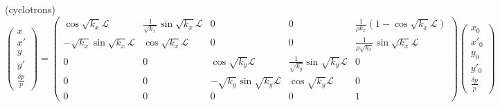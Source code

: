 \documentclass[12pt]{article}
\begin{document}
{ (cyclotrons)
{%
$$\left(
\begin{array}{ccccc} x \\ x' \\ y \\ y' \\ \frac{\textstyle{\delta p}}{\textstyle{p}} 
\end{array} 
\right)
\! = \!
\left(
\begin{array}{ccccc} 
 \cos \sqrt{k_x} \mathcal{L} & \frac{\textstyle{1}}{\textstyle{\sqrt{k_x}}}  \sin \sqrt{k_x}  \mathcal{L}  
 & 0& 0 & \frac{\textstyle{1}}{\textstyle{\rho k_x}}(1 - \cos \sqrt{k_x} \mathcal{L} ) \\[-.4000ex]
 - \sqrt{k_x} \sin \sqrt{k_x}  \mathcal{L} 
&   \cos \sqrt{k_x}  \mathcal{L} 
 & 0 & 0 & \frac{\textstyle{1}}{\textstyle{\rho \sqrt{k_x}}}\sin \sqrt{k_x} \mathcal{L} \\[-.4000ex]
0 & 0 &  \cos \sqrt{k_y} \mathcal{L} & \frac{\textstyle{1}}{\textstyle{ \sqrt{k_y}}}  \sin \sqrt{k_y}  \mathcal{L} & 0 \\ [-.4000ex]
0 & 0 &  -\sqrt{k_y} \sin \sqrt{k_y}  \mathcal{L} &  \cos \sqrt{k_y}  \mathcal{L} & 0  \\[-.4000ex]
0 & 0 & 0 & 0 & 1 
\end{array} \right)
\left(
\begin{array}{ccccc} x_0 \\ x'_0 \\ y_0  \\ y'_0  \\ \frac{\textstyle{\delta p}}{\textstyle{p}} 
\end{array} 
\right)$$
}


}
\end{document}
